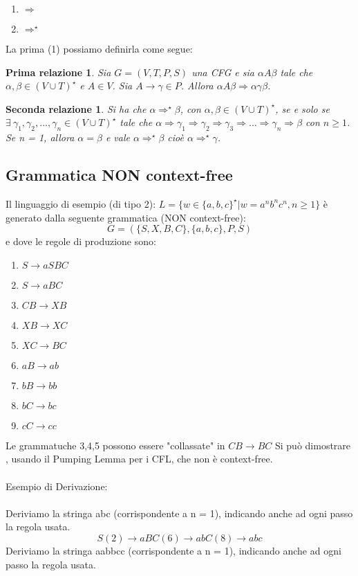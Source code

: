 \documentclass[11pt]{article}
\newtheorem*{relazioneNorm}{Prima relazione}
\newtheorem*{relazioneStar}{Seconda relazione}
\begin{document}
\begin{enumerate}
\item $\Rightarrow$
\item $\Rightarrow^{\star}$
\end{enumerate}
La prima (1) possiamo definirla come segue:
\begin{relazioneNorm}
Sia $G=(V, T,P,S)$ una CFG e sia $\alpha A \beta$ tale che $\alpha,\beta \in (V\cup T)^{\star}$ e $A \in V$. Sia $A \rightarrow \gamma \in P$. Allora $\alpha A\beta \Rightarrow \alpha \gamma \beta$.
\end{relazioneNorm}
\begin{relazioneStar}
Si ha che $\alpha \Rightarrow^{\star} \beta$, con $\alpha, \beta \in (V \cup T)^{\star}$, se e solo se $\exists \medspace \gamma_{1}, \gamma_{2}, ... ,\gamma_{n} \in (V\cup T)^{\star}$ tale che $\alpha \Rightarrow \gamma_{1} \Rightarrow \gamma_{2} \Rightarrow \gamma_{3} \Rightarrow ... \Rightarrow \gamma_{n} \Rightarrow \beta$ con $n \geq 1$.
Se n = 1, allora $\alpha = \beta$ e vale $\alpha \Rightarrow^{\star} \beta$ cioè $\alpha \Rightarrow^{\star} \gamma$.
\end{relazioneStar}
\subsection{Grammatica NON context-free}
Il linguaggio di esempio (di tipo 2): $L = \{w \in \{a,b,c\}^{\star} | w = a^nb^nc^n, n\geq 1\}$
è generato dalla seguente grammatica (NON context-free): $$ G=(\{S,X,B,C\}, \{a,b,c\}, P, S)$$
e dove le regole di produzione sono:
\begin{enumerate}
	\item $S \rightarrow aSBC$
	\item $S \rightarrow aBC$
	\item $CB \rightarrow XB$
	\item $XB \rightarrow XC$
	\item $XC \rightarrow BC$
	\item $aB \rightarrow ab$
	\item $bB \rightarrow bb$
	\item $bC \rightarrow bc$
	\item $cC \rightarrow cc$
\end{enumerate}
Le grammatuche 3,4,5 possono essere "collassate" in $CB \rightarrow BC$
Si può dimostrare , usando il Pumping Lemma per i CFL, che non è context-free.
\\ \\
Esempio di Derivazione:
\\ \\
Deriviamo la stringa abc (corrispondente a n = 1), indicando anche ad ogni passo la regola usata.
$$ S (2)\rightarrow aBC (6)\rightarrow abC (8)\rightarrow abc$$
Deriviamo la stringa aabbcc (corrispondente a n = 1), indicando anche ad ogni passo la regola usata.
\end{document}
